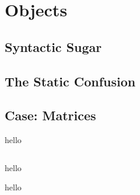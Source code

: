 \chapter{Objects}




\section{Syntactic Sugar}



\section{The Static Confusion}



\section{Case: Matrices}

\csharpsection{\csharp}
hello

\inputminted[fontsize=\small]{csharp}{../src/csharp/matrix/Matrix.cs}

hello

hello


